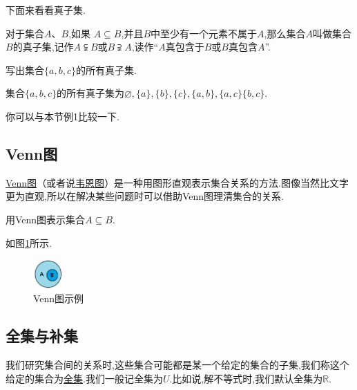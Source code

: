 \documentclass[lang=cn,math=cm,chinesefont=nofont,11pt,scheme=chinese,twocol]{elegantbook}
\begin{document}
下面来看看真子集.

\begin{definition}[真子集]
  对于集合$A$、$B$,如果 $A\subseteq B$,并且$B$中至少有一个元素不属于$A$,那么集合$A$叫做集合$B$的真子集,记作$A\subsetneqq B$或$B\supsetneqq A$,读作“$A$真包含于$B$或$B$真包含$A$”.
\end{definition}

\begin{example}
  写出集合$\{a,b,c\}$的所有真子集.
\end{example}

\begin{solution}
  集合$\{a,b,c\}$的所有真子集为$\varnothing ,\{a\},\{b\},\{c\},\{a,b\},\{a,c\}\{b,c\}$.
\end{solution}

\begin{remark}
  你可以与本节例1比较一下.
\end{remark}

\subsection{Venn图}

\underline{Venn图}（或者说\underline{韦恩图}）是一种用图形直观表示集合关系的方法.图像当然比文字更为直观,所以在解决某些问题时可以借助Venn图理清集合的关系.

\begin{example}
  用Venn图表示集合$A\subseteq B$.
\end{example}

\begin{solution}
  如图\ref{img:Venn1}所示.
\end{solution}

\begin{figure}[h]
  \centering
  \includegraphics[width=0.1\textwidth]{image/Venn1.png}
  \caption{Venn图示例}
  \label{img:Venn1}
\end{figure}

\subsection{全集与补集}

我们研究集合间的关系时,这些集合可能都是某一个给定的集合的子集,我们称这个给定的集合为\underline{全集}.我们一般记全集为$U$.比如说,解不等式时,我们默认全集为$\mathbb{R}$.
\end{document}
